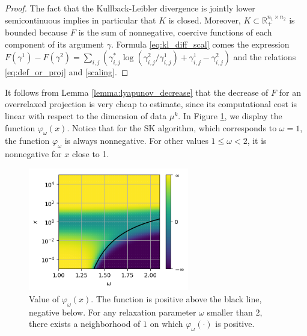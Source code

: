 \documentclass{article} %
\DeclareMathOperator{\Ccal}{\mathcal{C}}
\theoremstyle{plain}
\theoremstyle{definition}
\theoremstyle{remark}
\begin{document}
\begin{proof}
The fact that the Kullback-Leibler divergence is jointly lower semicontinuous implies in particular that $K$ is closed. Moreover, $K\subset \mathbb{R}^{n_1\times n_2}_+$ is bounded because $F$ is the sum of nonnegative, coercive functions of each component of its argument $\gamma$.
%
Formula \eqref{eq:kl_diff_scal} comes the expression $F(\gamma^1)-F(\gamma^2)= \sum_{i,j}\left(\gamma^*_{i,j}\log(\gamma^2_{i,j}/\gamma^1_{i,j})+\gamma^1_{i,j}-\gamma^2_{i,j}\right)$ and the relations \eqref{eq:def_or_proj} and \eqref{scaling}.
\end{proof}



It follows from Lemma \ref{lemma:lyapunov_decrease} that the decrease of $F$ for an overrelaxed projection is very cheap to estimate, since its computational cost is linear with respect to the dimension of data $\mu^k$. In Figure \ref{phi_omega}, we display the function  $\varphi_\omega(x)$. Notice that for the SK algorithm, which corresponds to $\omega=1$, the function $\varphi_\omega$ is always nonnegative. For other values $1\le\omega<2$, it is nonnegative for $x$ close to 1.

\begin{figure}[ht!]
\begin{center}
\includegraphics[width=7cm]{images/cvgce_zone}
\caption{\label{phi_omega} Value of $\varphi_\omega(x)$. The function is positive above the black line, negative below. For any relaxation parameter $\omega$ smaller than $2$, there exists a neighborhood of $1$ on which $\varphi_\omega(\cdot)$ is positive.}
\end{center}
\end{figure}
\end{document}
